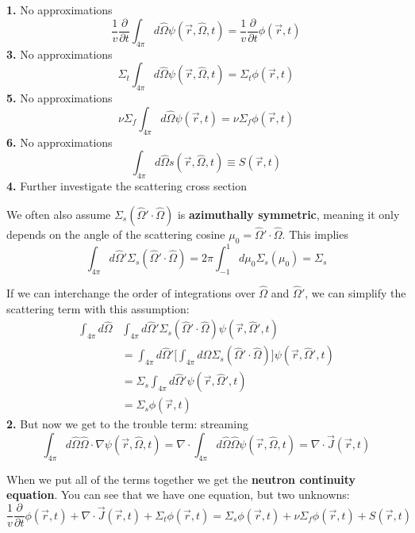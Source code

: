 \documentclass[12pt]{article}
\newcommand{\vOmega}{\ensuremath{\hat{\Omega}}}
\begin{document}
\textbf{1.} No approximations
\begin{equation}
\frac{1}{v}\frac{\partial}{\partial t} \int_{4\pi} d\vOmega  \psi(\vec{r}, \vOmega, t) = \boxed{\frac{1}{v}\frac{\partial}{\partial t}\phi(\vec{r}, t)}
\end{equation}
\textbf{3.} No approximations
\begin{equation}
\Sigma_t \int_{4\pi} d\vOmega \psi(\vec{r}, \vOmega, t) = \boxed{\Sigma_t \phi(\vec{r}, t)}
\end{equation}
\textbf{5.} No approximations
\begin{equation}
\nu \Sigma_f \int_{4\pi} d\vOmega \psi(\vec{r},t) = \boxed{\nu \Sigma_f \phi(\vec{r}, t)}
\end{equation}
\textbf{6.} No approximations
\begin{equation}
\int_{4\pi} d\vOmega s(\vec{r}, \vOmega, t) \equiv \boxed{S(\vec{r}, t)}
\end{equation}
\textbf{4.} Further investigate the scattering cross section

We often also assume $\Sigma_s(\vOmega' \cdot \vOmega)$ is \textbf{azimuthally symmetric}, meaning it only depends on the angle of the scattering cosine $\mu_0 =\vOmega' \cdot \vOmega$.  This implies
\[\int_{4\pi} d\vOmega' \Sigma_s(\vOmega' \cdot \vOmega) = 2\pi \int_{-1}^{1} d\mu_0 \Sigma_s(\mu_0) = \Sigma_s\]

If we can interchange the order of integrations over $\vOmega$ and $\vOmega'$, we can simplify the scattering term with this assumption:
%
\begin{align}
\int_{4\pi} d\vOmega &\int_{4\pi} d\vOmega' \Sigma_s(\vOmega' \cdot \vOmega) \psi(\vec{r}, \vOmega', t)\\
%
&= \int_{4\pi} d\vOmega' \bigl[ \int_{4\pi} d\vOmega \Sigma_s(\vOmega' \cdot \vOmega)\bigr] \psi(\vec{r}, \vOmega', t)\\
%
&= \Sigma_s \int_{4\pi} d\vOmega' \psi(\vec{r}, \vOmega', t) \\
%
&= \boxed{\Sigma_s \phi(\vec{r}, t)}
\end{align}
\textbf{2.} But now we get to the trouble term: streaming
%
\[\int_{4\pi} d\vOmega \vOmega \cdot \nabla \psi(\vec{r}, \vOmega, t) = \nabla \cdot \int_{4\pi} d\vOmega \vOmega \psi(\vec{r}, \vOmega, t) = \nabla \cdot \vec{J}(\vec{r}, t) \]

\vspace*{2em}
When we put all of the terms together we get the \textbf{neutron continuity equation}. You can see that we have one equation, but two unknowns:
\begin{equation}
\frac{1}{v}\frac{\partial}{\partial t}\phi(\vec{r}, t) + 
\nabla \cdot \vec{J}(\vec{r}, t) + 
\Sigma_t \phi(\vec{r}, t) =
\Sigma_s \phi(\vec{r}, t) +
\nu \Sigma_f \phi(\vec{r}, t) +
S(\vec{r}, t)
\end{equation}
\end{document}
